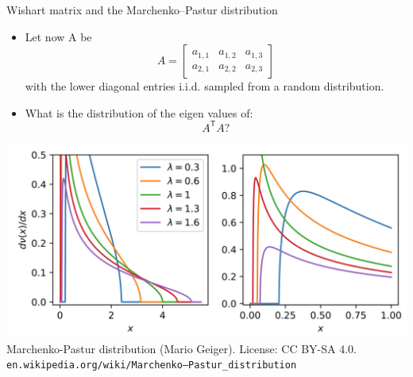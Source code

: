 \documentclass[english,aspectratio=1610]{beamer} %
\newcommand{\trnsp}{\mathsf{T}}
\begin{document}
\begin{frame}{Wishart matrix and the Marchenko–Pastur distribution}
	\begin{itemize}
    \item 
    Let now A be
    \begin{equation*}
       A = 
        \begin{bmatrix}
            a_{1, 1} & a_{1, 2} & a_{1, 3}\\
            a_{2, 1} & a_{2, 2} & a_{2, 3}
        \end{bmatrix}
    \end{equation*}
    with the lower diagonal entries i.i.d. sampled from a random distribution. 
     \item 
     What is the distribution of the eigen values of:
     \begin{equation*}
     A^\trnsp A ?
    \end{equation*}
    \end{itemize}
    \begin{center}
	        \includegraphics[width=.5\linewidth]{figures/mp distribution.png}\\
            \tiny{Marchenko-Pastur distribution  (Mario Geiger). License: CC BY-SA 4.0.}\\
            \tiny{\texttt{en.wikipedia.org/wiki/Marchenko–Pastur\_distribution}}
            
        \end{center}
\end{frame}
\end{document}
